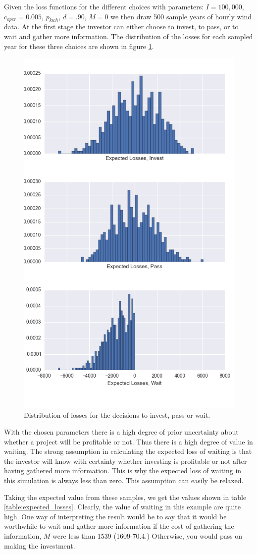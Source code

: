 \documentclass[11pt]{article}
\begin{document}
Given the loss functions for the different choices with parameters: $I=100,000$, $c_{oper}=0.005$, $p_{kwh}$, $d=.90$, $M=0$ we then draw 500 sample years of hourly wind data. At the first stage the investor can either choose to invest, to pass, or to wait and gather more information. The distribution of the losses for each sampled year for these three choices are shown in figure \ref{losses}.

\begin{figure}
	\centering
	\includegraphics[width=.6\textwidth]{figures/losses.png}
	\caption{Distribution of losses for the decisions to invest, pass or wait.}
	\label{losses}
\end{figure}

With the chosen parameters there is a high degree of prior uncertainty about whether a project will be profitable or not. Thus there is a high degree of value in waiting. The strong assumption in calculating the expected loss of waiting is that the investor will know with certainty whether investing is profitable or not after having gathered more information. This is why the expected loss of waiting in this simulation is always less than zero. This assumption can easily be relaxed.

Taking the expected value from these samples, we get the values shown in table \ref{table:expected_losses}. Clearly, the value of waiting in this example are quite high. One way of interpreting the result would be to say that it would be worthwhile to wait and gather more information if the cost of gathering the information, $M$ were less than 1539 (1609-70.4.) Otherwise, you would pass on making the investment. 
\end{document}
